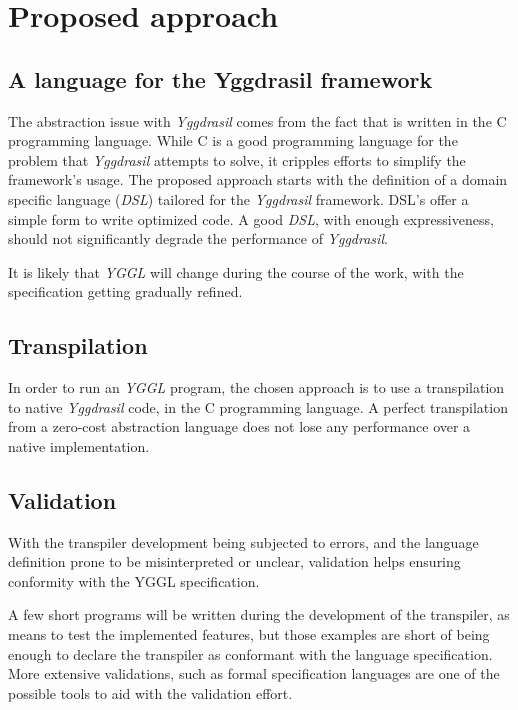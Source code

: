 \documentclass[runningheads]{../llncs}
\begin{document}
\section{Proposed approach}
\label{proposed}
\subsection{A language for the Yggdrasil framework}
The abstraction issue with \textit{Yggdrasil} comes from the fact that is written in the C programming language. While C is a good programming language for the problem that \textit{Yggdrasil} attempts to solve, it cripples efforts to simplify the framework's usage.
The proposed approach starts with the definition of a domain specific language (\textit{DSL}) tailored for the \textit{Yggdrasil} framework.
DSL's offer a simple form to write optimized code. A good \textit{DSL}, with enough expressiveness, should not significantly degrade the performance of \textit{Yggdrasil}.
\par It is likely that \textit{YGGL} will change during the course of the work, with the specification getting gradually refined.
\subsection{Transpilation}
In order to run an \textit{YGGL} program, the chosen approach is to use a transpilation to native \textit{Yggdrasil} code, in the C programming language.
A perfect transpilation from a zero-cost abstraction language does not lose any performance over a native implementation.
\subsection{Validation}
With the transpiler development being subjected to errors, and the language definition prone to be misinterpreted or unclear, validation helps ensuring conformity with the YGGL specification.
\par A few short programs will be written during the development of the transpiler, as means to test the implemented features, but those examples are short of being enough to declare the transpiler as conformant with the language specification. More extensive validations, such as formal specification languages are one of the possible tools to aid with the validation effort.
\end{document}
